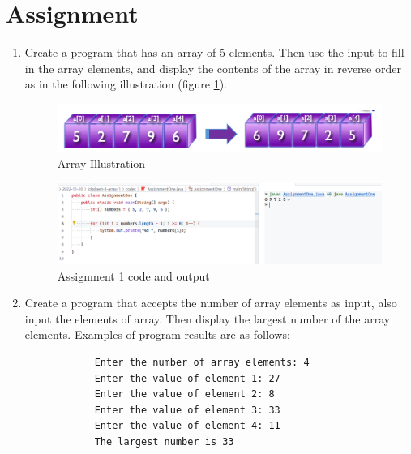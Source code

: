 \documentclass[12pt,titlepage]{article}
\begin{document}
\section{Assignment}
\begin{enumerate}
    \item {
        Create a program that has an array of 5 elements. Then use the input to fill in
        the array elements, and display the contents of the array in reverse order as in the following illustration (figure \ref{array-illustration}).

        \begin{figure}[h]
            \centering
            \includegraphics[width=.8\textwidth]{./images/array-illustration.png}
            \caption{Array Illustration}
            \label{array-illustration}
        \end{figure}

        \begin{figure}[h]
            \centering
            \includegraphics[width=.8\textwidth]{./images/assignment-one.png}
            \caption{Assignment 1 code and output}
        \end{figure}
    }
    \pagebreak
    \item {
        Create a program that accepts the number of array elements as input, also input the elements of array.
        Then display the largest number of the array elements. Examples of program results are as follows:

        \begin{verbatim}
            Enter the number of array elements: 4
            Enter the value of element 1: 27
            Enter the value of element 2: 8
            Enter the value of element 3: 33
            Enter the value of element 4: 11
            The largest number is 33
        \end{verbatim}

}
\end{enumerate}
\end{document}
